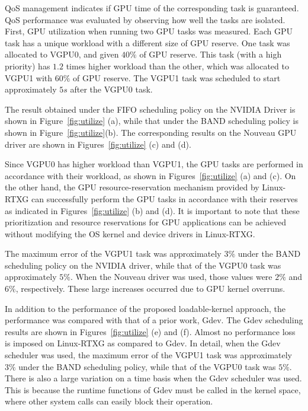 QoS management indicates if GPU time of the corresponding task is guaranteed.
QoS performance was evaluated by observing how well the tasks are isolated.
First, GPU utilization when running two GPU tasks was measured.
Each GPU task has a unique workload with a different size of GPU reserve.
One task was allocated to VGPU0, and given $40\%$ of GPU reserve.
This task (with a high priority) has $1.2$ times higher workload than the other, which was allocated to VGPU1 with $60\%$ of GPU reserve.
The VGPU1 task was scheduled to start approximately $5s$ after the VGPU0 task.


The result obtained under the FIFO scheduling policy on the NVIDIA Driver is shown in Figure~\ref{fig:utilize} (a), while that under the BAND scheduling policy is shown in Figure~\ref{fig:utilize}(b).
The corresponding results on the Nouveau GPU driver are shown in Figures~\ref{fig:utilize} (c) and (d).


Since VGPU0 has higher workload than VGPU1, the GPU tasks are performed in accordance with their workload, as shown in Figures~\ref{fig:utilize} (a) and (c).
On the other hand, the GPU resource-reservation mechanism provided by Linux-RTXG can successfully perform the GPU tasks in accordance with their reserves as indicated in Figures~\ref{fig:utilize} (b) and (d).
It is important to note that these prioritization and resource reservations for GPU applications can be achieved without modifying the OS kernel and device drivers in Linux-RTXG.


The maximum error of the VGPU1 task was approximately $3\%$ under the BAND scheduling policy on the NVIDIA driver, while that of the VGPU0 task was approximately $5\%$.
When the Nouveau driver was used, those values were $2\%$ and $6\%$, respectively.
These large increases occurred due to GPU kernel overruns.


In addition to the performance of the proposed loadable-kernel approach, the performance was compared with that of a prior work, Gdev.
The Gdev scheduling results are shown in Figures~\ref{fig:utilize} (e) and (f).
Almost no performance loss is imposed on Linux-RTXG as compared to Gdev.
In detail, when the Gdev scheduler was used, the maximum error of the VGPU1 task was approximately $3\%$ under the BAND scheduling policy, while that of the VGPU0 task was $5\%$.
There is also a large variation on a time basis when the Gdev scheduler was used.
This is because the runtime functions of Gdev must be called in the kernel space, where other system calls can easily block their operation.


